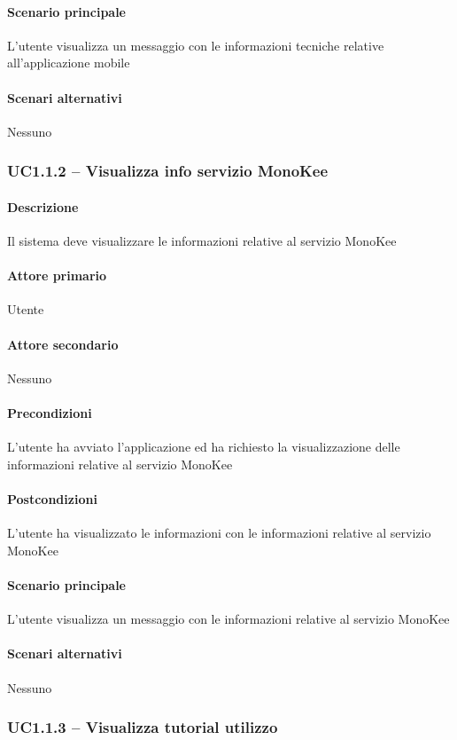 \paragraph{Scenario principale}  
L’utente visualizza un messaggio con le informazioni tecniche relative all’applicazione mobile
\paragraph{Scenari alternativi}  Nessuno


\subsubsection{UC1.1.2 – Visualizza info servizio MonoKee}
\paragraph{Descrizione}  Il sistema deve visualizzare le informazioni relative al servizio MonoKee
\paragraph{Attore primario}  Utente
\paragraph{Attore secondario}  Nessuno
\paragraph{Precondizioni}  L’utente ha avviato l’applicazione ed ha richiesto la visualizzazione delle informazioni relative al servizio MonoKee
\paragraph{Postcondizioni}  L’utente ha visualizzato le informazioni con le informazioni relative al servizio MonoKee
\paragraph{Scenario principale}  
L’utente visualizza un messaggio con le informazioni relative al servizio MonoKee
\paragraph{Scenari alternativi}  Nessuno


\subsubsection{UC1.1.3 – Visualizza tutorial utilizzo}
